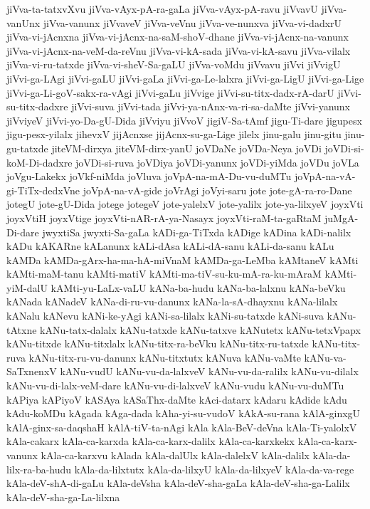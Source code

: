 {jiVva-ta-tatxvXvu
jiVva-vAyx-pA-ra-gaLa
jiVva-vAyx-pA-ravu
jiVvavU
jiVva-vanUnx
jiVva-vanunx
jiVvaveV
jiVva-veVnu
jiVva-ve-nunxva
jiVva-vi-dadxrU
jiVva-vi-jAcnxna
jiVva-vi-jAcnx-na-saM-shoV-dhane
jiVva-vi-jAcnx-na-vanunx
jiVva-vi-jAcnx-na-veM-da-reVnu
jiVva-vi-kA-sada
jiVva-vi-kA-savu
jiVva-vilalx
jiVva-vi-ru-tatxde
jiVva-vi-sheV-Sa-gaLU
jiVva-voMdu
jiVvavu
jiVvi
jiVvigU
jiVvi-ga-LAgi
jiVvi-gaLU
jiVvi-gaLa
jiVvi-ga-Le-lalxra
jiVvi-ga-LigU
jiVvi-ga-Lige
jiVvi-ga-Li-goV-sakx-ra-vAgi
jiVvi-gaLu
jiVvige
jiVvi-su-titx-dadx-rA-darU
jiVvi-su-titx-dadxre
jiVvi-suva
jiVvi-tada
jiVvi-ya-nAnx-va-ri-sa-daMte
jiVvi-yanunx
jiVviyeV
jiVvi-yo-Da-gU-Dida
jiVviyu
jiVvoV
jigiV-Sa-tAmf
jigu-Ti-dare
jigupesx
jigu-pesx-yilalx
jihevxV
jijAcnxse
jijAcnx-su-ga-Lige
jilelx
jinu-galu
jinu-gitu
jinu-gu-tatxde
jiteVM-dirxya
jiteVM-dirx-yanU
joVDaNe
joVDa-Neya
joVDi
joVDi-si-koM-Di-dadxre
joVDi-si-ruva
joVDiya
joVDi-yanunx
joVDi-yiMda
joVDu
joVLa
joVgu-Lakekx
joVkf-niMda
joVluva
joVpA-na-mA-Du-vu-duMTu
joVpA-na-vA-gi-TiTx-dedxVne
joVpA-na-vA-gide
joVrAgi
joVyi-saru
jote
jote-gA-ra-ro-Dane
jotegU
jote-gU-Dida
jotege
jotegeV
jote-yalelxV
jote-yalilx
jote-ya-lilxyeV
joyxVti
joyxVtiH
joyxVtige
joyxVti-nAR-rA-ya-Nasayx
joyxVti-raM-ta-gaRtaM
juMgA-Di-dare
jwyxtiSa
jwyxti-Sa-gaLa
kADi-ga-TiTxda
kADige
kADina
kADi-nalilx
kADu
kAKARne
kALanunx
kALi-dAsa
kALi-dA-sanu
kALi-da-sanu
kALu
kAMDa
kAMDa-gArx-ha-ma-hA-miVnaM
kAMDa-ga-LeMba
kAMtaneV
kAMti
kAMti-maM-tanu
kAMti-matiV
kAMti-ma-tiV-su-ku-mA-ra-ku-mAraM
kAMti-yiM-dalU
kAMti-yu-LaLx-vaLU
kANa-ba-hudu
kANa-ba-lalxnu
kANa-beVku
kANada
kANadeV
kANa-di-ru-vu-danunx
kANa-la-sA-dhayxnu
kANa-lilalx
kANalu
kANevu
kANi-ke-yAgi
kANi-sa-lilalx
kANi-su-tatxde
kANi-suva
kANu-tAtxne
kANu-tatx-dalalx
kANu-tatxde
kANu-tatxve
kANutetx
kANu-tetxVpapx
kANu-titxde
kANu-titxlalx
kANu-titx-ra-beVku
kANu-titx-ru-tatxde
kANu-titx-ruva
kANu-titx-ru-vu-danunx
kANu-titxtutx
kANuva
kANu-vaMte
kANu-va-SaTxnenxV
kANu-vudU
kANu-vu-da-lalxveV
kANu-vu-da-ralilx
kANu-vu-dilalx
kANu-vu-di-lalx-veM-dare
kANu-vu-di-lalxveV
kANu-vudu
kANu-vu-duMTu
kAPiya
kAPiyoV
kASAya
kASaThx-daMte
kAci-datarx
kAdaru
kAdide
kAdu
kAdu-koMDu
kAgada
kAga-dada
kAha-yi-su-vudoV
kAkA-su-rana
kAlA-ginxgU
kAlA-ginx-sa-daqshaH
kAlA-tiV-ta-nAgi
kAla
kAla-BeV-deVna
kAla-Ti-yalolxV
kAla-cakarx
kAla-ca-karxda
kAla-ca-karx-dalilx
kAla-ca-karxkekx
kAla-ca-karx-vanunx
kAla-ca-karxvu
kAlada
kAla-dalUlx
kAla-dalelxV
kAla-dalilx
kAla-da-lilx-ra-ba-hudu
kAla-da-lilxtutx
kAla-da-lilxyU
kAla-da-lilxyeV
kAla-da-va-rege
kAla-deV-shA-di-gaLu
kAla-deVsha
kAla-deV-sha-gaLa
kAla-deV-sha-ga-Lalilx
kAla-deV-sha-ga-La-lilxna
}
